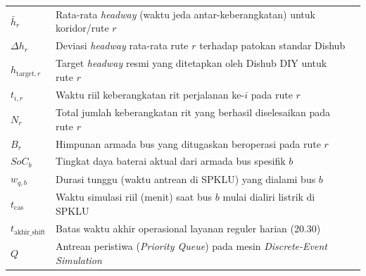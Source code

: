 \begin{longtable}{@{} l >{\raggedright\arraybackslash}p{6.5cm} c @{}}
$\bar{h}_r$ & Rata-rata \textit{headway} (waktu jeda antar-keberangkatan) untuk koridor/rute $r$ & \pageref{eq:headway-dev} \\
$\Delta h_r$ & Deviasi \textit{headway} rata-rata rute $r$ terhadap patokan standar Dishub & \pageref{eq:headway-dev} \\
$h_{\text{target},r}$ & Target \textit{headway} resmi yang ditetapkan oleh Dishub DIY untuk rute $r$ & \pageref{eq:headway-dev} \\
$t_{i,r}$ & Waktu riil keberangkatan rit perjalanan ke-$i$ pada rute $r$ & \pageref{eq:headway-dev} \\
$N_r$ & Total jumlah keberangkatan rit yang berhasil diselesaikan pada rute $r$ & \pageref{eq:headway-dev} \\[1ex]

$B_r$ & Himpunan armada bus yang ditugaskan beroperasi pada rute $r$ & \pageref{eq:degraded-route} \\
$SoC_b$ & Tingkat daya baterai aktual dari armada bus spesifik $b$ & \pageref{eq:degraded-route} \\
$w_{q,b}$ & Durasi tunggu (waktu antrean di SPKLU) yang dialami bus $b$ & \pageref{eq:degraded-route} \\
$t_{\text{cas}}$ & Waktu simulasi riil (menit) saat bus $b$ mulai dialiri listrik di SPKLU & \pageref{eq:degraded-route} \\
$t_{\text{akhir\_shift}}$ & Batas waktu akhir operasional layanan reguler harian (20.30) & \pageref{eq:degraded-route} \\
$Q$ & Antrean peristiwa (\textit{Priority Queue}) pada mesin \textit{Discrete-Event Simulation} & \pageref{alg:des-loop} \\

\end{longtable}
